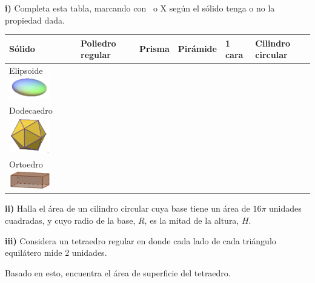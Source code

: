 \documentclass[12pt,a4paper]{article}
\begin{document}
\begin{tcolorbox}[colback=fondoverde, colframe=verdeclaro, title=\textbf{PRACTICA}, breakable]
\textbf{i)} Completa esta tabla, marcando con \checkmark\ o X según el sólido tenga o no la propiedad dada.

\begin{center}
\small
\begin{tabular}{|
		>{\centering\arraybackslash}m{2.5cm}|
		>{\centering\arraybackslash}m{2cm}|
		>{\centering\arraybackslash}m{1.5cm}|
		>{\centering\arraybackslash}m{2cm}|
		>{\centering\arraybackslash}m{1.5cm}|
		>{\centering\arraybackslash}m{2cm}|}
\hline
\textbf{Sólido} & \textbf{Poliedro regular} & \textbf{Prisma} & \textbf{Pirámide} & \textbf{1 cara} & \textbf{Cilindro circular} \\
\hline
Elipsoide \newline \includegraphics[width=1.8cm]{Figuras/fig54.png} & & & & & \\
\hline
Dodecaedro \newline \includegraphics[width=1.8cm]{Figuras/fig55.png} & & & & & \\
\hline
Ortoedro \newline \includegraphics[width=1.8cm]{Figuras/fig56.png} & & & & & \\
\hline
\end{tabular}
\end{center}

\textbf{ii)} Halla el área de un cilindro circular cuya base tiene un área de $16\pi$ unidades cuadradas, y cuyo radio de la base, $R$, es la mitad de la altura, $H$.

\textbf{iii)} Considera un tetraedro regular en donde cada lado de cada triángulo equilátero mide 2 unidades.

Basado en esto, encuentra el área de superficie del tetraedro.
\end{tcolorbox}

\vspace{4mm}
\end{document}
